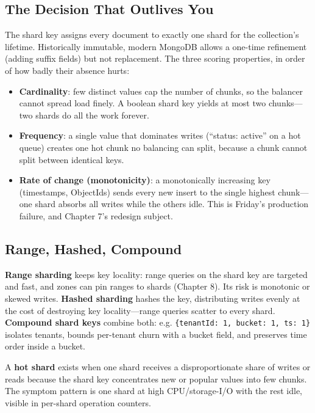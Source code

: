 \subsection{The Decision That Outlives You}
The shard key assigns every document to exactly one shard for the collection's lifetime. Historically immutable, modern MongoDB allows a one-time refinement (adding suffix fields) but not replacement. The three scoring properties, in order of how badly their absence hurts:

\begin{itemize}
    \item \textbf{Cardinality}: few distinct values cap the number of chunks, so the balancer cannot spread load finely. A boolean shard key yields at most two chunks---two shards do all the work forever.
    \item \textbf{Frequency}: a single value that dominates writes (``status: active'' on a hot queue) creates one hot chunk no balancing can split, because a chunk cannot split between identical keys.
    \item \textbf{Rate of change (monotonicity)}: a monotonically increasing key (timestamps, ObjectIds) sends every new insert to the single highest chunk---one shard absorbs all writes while the others idle. This is Friday's production failure, and Chapter 7's redesign subject.
\end{itemize}

\subsection{Range, Hashed, Compound}
\textbf{Range sharding} keeps key locality: range queries on the shard key are targeted and fast, and zones can pin ranges to shards (Chapter 8). Its risk is monotonic or skewed writes. \textbf{Hashed sharding} hashes the key, distributing writes evenly at the cost of destroying key locality---range queries scatter to every shard. \textbf{Compound shard keys} combine both: e.g. \texttt{\{tenantId: 1, bucket: 1, ts: 1\}} isolates tenants, bounds per-tenant churn with a bucket field, and preserves time order inside a bucket.

\begin{definitionbox}
A \textbf{hot shard} exists when one shard receives a disproportionate share of writes or reads because the shard key concentrates new or popular values into few chunks. The symptom pattern is one shard at high CPU/storage-I/O with the rest idle, visible in per-shard operation counters.
\end{definitionbox}

